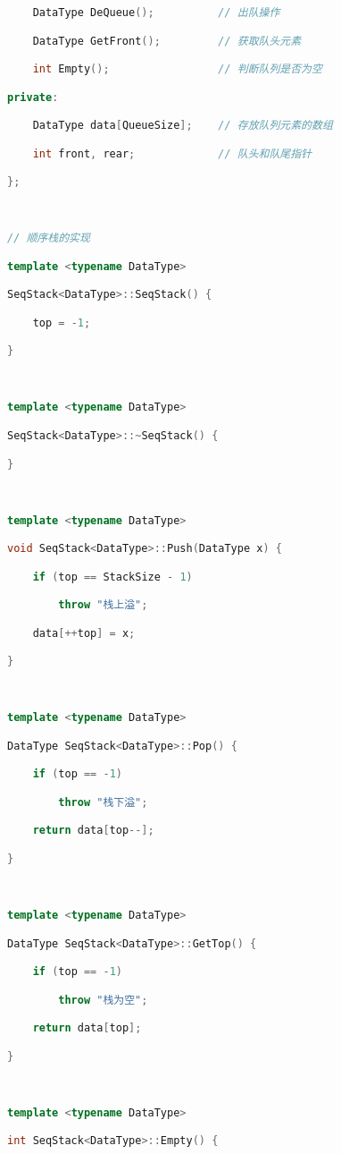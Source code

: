 \begin{lstlisting}[language=C++]
    DataType DeQueue();          // 出队操作

    DataType GetFront();         // 获取队头元素

    int Empty();                 // 判断队列是否为空

private:

    DataType data[QueueSize];    // 存放队列元素的数组

    int front, rear;             // 队头和队尾指针

};

  

// 顺序栈的实现

template <typename DataType>

SeqStack<DataType>::SeqStack() {

    top = -1;

}

  

template <typename DataType>

SeqStack<DataType>::~SeqStack() {

}

  

template <typename DataType>

void SeqStack<DataType>::Push(DataType x) {

    if (top == StackSize - 1)

        throw "栈上溢";

    data[++top] = x;

}

  

template <typename DataType>

DataType SeqStack<DataType>::Pop() {

    if (top == -1)

        throw "栈下溢";

    return data[top--];

}

  

template <typename DataType>

DataType SeqStack<DataType>::GetTop() {

    if (top == -1)

        throw "栈为空";

    return data[top];

}

  

template <typename DataType>

int SeqStack<DataType>::Empty() {


\end{lstlisting}
